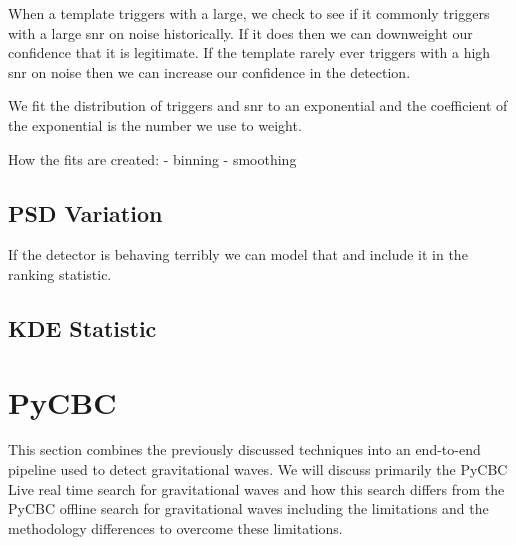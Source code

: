 When a template triggers with a large, we check to see if it commonly triggers with a large snr on noise historically. If it does then we can downweight our confidence that it is legitimate. If the template rarely ever triggers with a high snr on noise then we can increase our confidence in the detection.

We fit the distribution of triggers and snr to an exponential and the coefficient of the exponential is the number we use to weight.

How the fits are created:
- binning
- smoothing

\subsection{\label{sec:psd-variation}PSD Variation}

If the detector is behaving terribly we can model that and include it in the ranking statistic.

\subsection{\label{sec:kde-statistic} KDE Statistic}

\section{\label{sec:pycbc-live}PyCBC}





This section combines the previously discussed techniques into an end-to-end pipeline used to detect gravitational waves. We will discuss primarily the PyCBC Live real time search for gravitational waves and how this search differs from the PyCBC offline search for gravitational waves including the limitations and the methodology differences to overcome these limitations.

